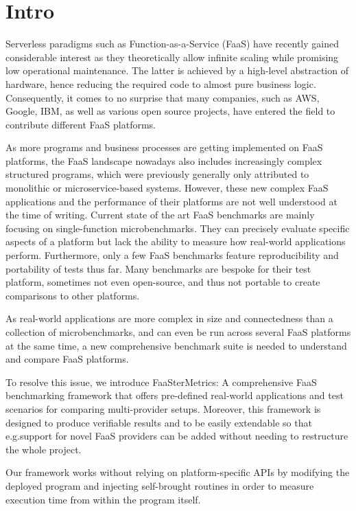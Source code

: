 \documentclass[../main.tex]{subfiles}
\begin{document}
\section{Intro}\label{sec:Intro}

Serverless paradigms such as Function-as-a-Service (FaaS) have recently gained considerable interest 
as they theoretically allow infinite scaling while promising low operational maintenance. 
The latter is achieved by a high-level abstraction of hardware, 
hence reducing the required code to almost pure business logic. 
Consequently, it comes to no surprise that many companies, such as AWS, Google, IBM, 
as well as various open source projects, have entered the field to contribute different FaaS platforms.

As more programs and business processes are getting implemented on FaaS platforms, 
the FaaS landscape nowadays also includes increasingly complex structured programs, 
which were previously generally only attributed to monolithic or microservice-based systems. 
However, these new complex FaaS applications and the performance of their platforms are not well understood at the time of writing. 
Current state of the art FaaS benchmarks are mainly focusing on single-function microbenchmarks. 
They can precisely evaluate specific aspects of a platform but lack the ability to measure how real-world applications perform. 
Furthermore, only a few FaaS benchmarks feature reproducibility and portability of tests thus far. 
Many benchmarks are bespoke for their test platform, sometimes not even open-source, 
and thus not portable to create comparisons to other platforms.

As real-world applications are more complex in size and connectedness than a collection of microbenchmarks, 
and can even be run across several FaaS platforms at the same time, 
a new comprehensive benchmark suite is needed to understand and compare FaaS platforms.

To resolve this issue, we introduce FaaSterMetrics: 
A comprehensive FaaS benchmarking framework that offers pre-defined real-world applications and 
test scenarios for comparing multi-provider setups. 
Moreover, this framework is designed to produce verifiable results and to be easily extendable 
so that e.g.\@ support for novel FaaS providers can be added without needing to restructure the whole project.

Our framework works without relying on platform-specific APIs 
by modifying the deployed program and injecting self-brought routines 
in order to measure execution time from within the program itself.
\end{document}
